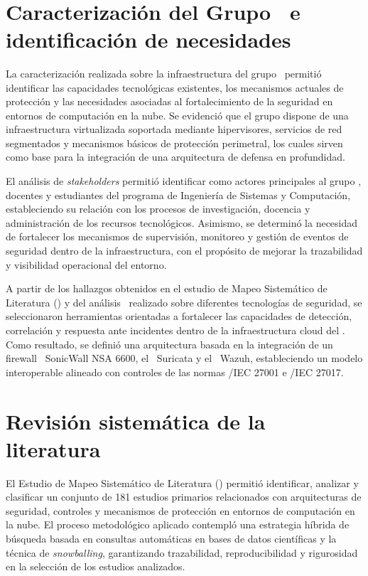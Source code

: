 \label{cap:resultados}
\mbox{}\\

\section{Caracterización del Grupo \GRID\ e identificación de necesidades}
\noindent

La caracterización realizada sobre la infraestructura del grupo \GRID\ permitió identificar las capacidades tecnológicas existentes, los 
mecanismos actuales de protección y las necesidades asociadas al fortalecimiento de la seguridad en entornos de computación en la nube. Se 
evidenció que el grupo dispone de una infraestructura virtualizada soportada mediante hipervisores, servicios de red segmentados y
mecanismos básicos de protección perimetral, los cuales sirven como base para la integración de una arquitectura de defensa en profundidad.

El análisis de \textit{stakeholders} permitió identificar como actores principales al grupo \GRID, docentes y estudiantes del programa de 
Ingeniería de Sistemas y Computación, estableciendo su relación con los procesos de investigación, docencia y administración de los 
recursos tecnológicos. Asimismo, se determinó la necesidad de fortalecer los mecanismos de supervisión, monitoreo y gestión de eventos de 
seguridad dentro de la infraestructura, con el propósito de mejorar la trazabilidad y visibilidad operacional del entorno.

A partir de los hallazgos obtenidos en el estudio de Mapeo Sistemático de Literatura (\SMS) y del análisis \DAR\ realizado sobre diferentes 
tecnologías de seguridad, se seleccionaron herramientas orientadas a fortalecer las capacidades de detección, correlación y respuesta ante 
incidentes dentro de la infraestructura cloud del \GRID. Como resultado, se definió una arquitectura basada en la integración de un 
firewall \NGFW\ SonicWall NSA 6600, el \IDPS\ Suricata y el \SIEM\ Wazuh, estableciendo un modelo interoperable alineado con controles de las 
normas \ISO/IEC 27001 e \ISO/IEC 27017.

\section{Revisión sistemática de la literatura}
\noindent

El Estudio de Mapeo Sistemático de Literatura (\SMS) permitió identificar, analizar y clasificar un conjunto de 181 estudios primarios 
relacionados con arquitecturas de seguridad, controles y mecanismos de protección en entornos de computación en la nube. El proceso 
metodológico aplicado contempló una estrategia híbrida de búsqueda basada en consultas automáticas en bases de datos científicas y la 
técnica de \textit{snowballing}, garantizando trazabilidad, reproducibilidad y rigurosidad en la selección de los estudios analizados.

